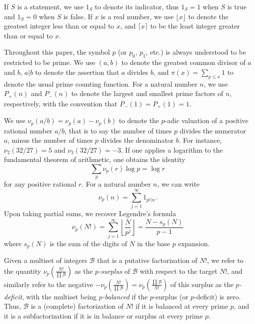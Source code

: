 \documentclass[10pt,a4paper,reqno]{amsart}
\numberwithin{equation}{section}
\theoremstyle{plain}
\theoremstyle{definition}
\newcommand\tuple{{\mathcal B}}
\begin{document}
If $S$ is a statement, we use $1_S$ to denote its indicator, thus $1_S=1$ when $S$ is true and $1_S=0$ when $S$ is false.  If $x$ is a real number, we use $\lfloor x \rfloor$ to denote the greatest integer less than or equal to $x$, and $\lceil x \rceil$ to be the least integer greater than or equal to $x$.

Throughout this paper, the symbol $p$ (or $p_0$, $p_1$, etc.) is always understood to be restricted to be prime.  
We use $(a,b)$ to denote the greatest common divisor of $a$ and $b$, $a|b$ to denote the assertion that $a$ divides $b$, and $\pi(x) = \sum_{p \leq x} 1$ to denote the usual prime counting function.  For a natural number $n$, we use $P_+(n)$ and $P_-(n)$ to denote the largest and smallest prime factors of $n$, respectively, with the convention that $P_-(1) = P_+(1) = 1$. 

We use $\nu_p(a/b) = \nu_p(a)-\nu_p(b)$ to denote the $p$-adic valuation of a positive rational number $a/b$, that is to say the number of times $p$ divides the numerator $a$, minus the number of times $p$ divides the denominator $b$.  For instance, $\nu_2(32/27)=5$ and $\nu_3(32/27)=-3$.
If one applies a logarithm to the fundamental theorem of arithmetic, one obtains the identity
\begin{equation}\label{ftoa}
  \sum_p \nu_p(r) \log p = \log r
\end{equation}
for any positive rational $r$.  
For a natural number $n$, we can write
\begin{equation}\label{nup-form} 
  \nu_p(n) = \sum_{j=1}^\infty 1_{p^j|n}.
\end{equation}
Upon taking partial sums, we recover Legendre's formula
\begin{equation}\label{legendre}
  \nu_p(N!) = \sum_{j=1}^\infty \left\lfloor \frac{N}{p^j} \right\rfloor = \frac{N - s_p(N)}{p-1}
\end{equation}
where $s_p(N)$ is the sum of the digits of $N$ in the base $p$ expansion.

Given a multiset of integers $\tuple$ that is a putative factorization of $N!$,  
we refer to the quantity $\nu_p\left( \frac{N!}{\prod \tuple} \right)$ as the \emph{$p$-surplus} of $\tuple$ with respect to the target $N!$, and similarly refer to the negative $-\nu_p\left( \frac{N!}{\prod \tuple} \right) = \nu_p\left( \frac{\prod \tuple}{N!} \right)$ of this surplus as the \emph{$p$-deficit}, with the multiset being \emph{$p$-balanced} if the $p$-surplus (or $p$-deficit) is zero.  Thus, $\tuple$ is a (complete) factorization of $N!$ if it is balanced at every prime $p$, and it is a subfactorization if it is in balance or surplus at every prime $p$.
\end{document}
